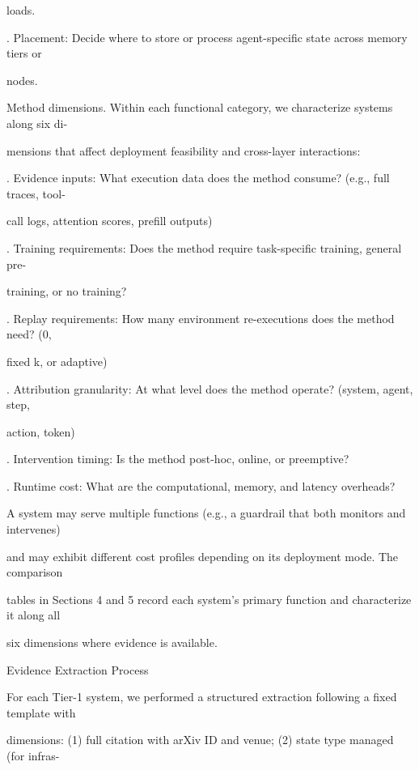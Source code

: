 \begin{flushleft}
\noindent  loads.\par
{}. Placement: Decide where to store or process agent-specific state across memory tiers or\par
\noindent  nodes.\par
\par\smallskip
\noindent Method dimensions. Within each functional category, we characterize systems along six di-\par
\noindent mensions that affect deployment feasibility and cross-layer interactions:\par
{}. Evidence inputs: What execution data does the method consume? (e.g., full traces, tool-\par
\noindent  call logs, attention scores, prefill outputs)\par
{}. Training requirements: Does the method require task-specific training, general pre-\par
\noindent  training, or no training?\par
{}. Replay requirements: How many environment re-executions does the method need? (0,\par
\noindent  fixed k, or adaptive)\par
{}. Attribution granularity: At what level does the method operate? (system, agent, step,\par
\noindent  action, token)\par
{}. Intervention timing: Is the method post-hoc, online, or preemptive?\par
{}. Runtime cost: What are the computational, memory, and latency overheads?\par
\noindent  A system may serve multiple functions (e.g., a guardrail that both monitors and intervenes)\par
\noindent and may exhibit different cost profiles depending on its deployment mode. The comparison\par
\noindent tables in Sections 4 and 5 record each system’s primary function and characterize it along all\par
\noindent six dimensions where evidence is available.\par
\par\smallskip
{} Evidence Extraction Process\par
\noindent For each Tier-1 system, we performed a structured extraction following a fixed template with\par
{} dimensions: (1) full citation with arXiv ID and venue; (2) state type managed (for infras-\par

\end{flushleft}
